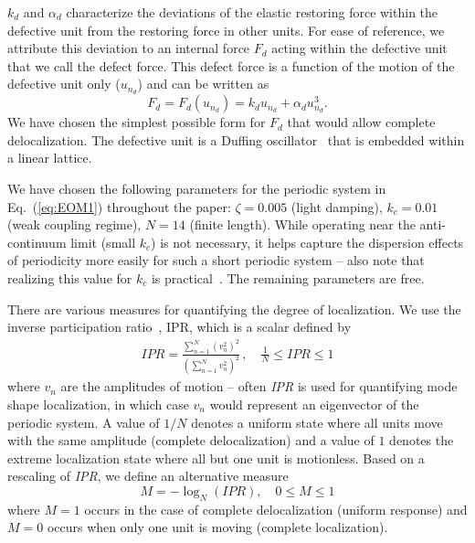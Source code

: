 \documentclass[aps,pre,twocolumn,groupedaddress]{revtex4-1}
\begin{document}
{\color{black}$k_d$ and $\alpha_d$ characterize the deviations of the elastic restoring force within the defective unit from the restoring force in other units. For ease of reference, we attribute this deviation to an internal force $F_d$ acting within the defective unit that we call the {defect force}. This defect force is a function of the motion of the defective unit only ($u_{n_d}$) and can be written as} 
\begin{equation}
	\label{eq:Fd}
	F_d=F_d(u_{n_d})=k_d u_{n_d} + \alpha_d u_{n_d}^3  .
\end{equation}
We have chosen the simplest possible form for $F_d$ that would allow complete delocalization. {\color{black}The defective unit is a Duffing oscillator~\cite{duffingBook} that is embedded within a linear lattice.}%


We have chosen the following parameters for the periodic system in Eq.~(\ref{eq:EOM1}) throughout the paper: $\zeta=0.005$ (light damping), $k_c=0.01$ (weak coupling regime), $N=14$ (finite length). While operating near the anti-continuum limit (small $k_c$) is not necessary, it helps capture the dispersion effects of periodicity more easily for such a short periodic system -- also note that realizing this value for $k_c$ is practical~\cite{DBcolloq,EnglishCuevas,JSV1}. 
The remaining parameters are free. 


There are various measures for quantifying the degree of localization. We use the inverse participation ratio~\cite{andersonRev}, IPR, which is a scalar defined by 
\begin{eqnarray*}
	\label{ipr}
	I\!P\!R = \frac{\sum^N_{n=1} (v_n^2)^2}{\left(\sum^N_{n=1} v_n^2\right)^2} \, , \quad \frac{1}{N} \le I\!P\!R \le 1
\end{eqnarray*}
where $v_n$ are the amplitudes of motion -- often \emph{IPR} is used for quantifying mode shape localization, in which case $v_n$ would represent an eigenvector of the periodic system. %
A value of $1/N$ denotes a uniform state where all units move with the same amplitude (complete delocalization) and a value of $1$ denotes the extreme localization state where all but one unit is motionless. 
Based on a rescaling of \emph{IPR}, we define an alternative measure
\begin{equation}
	M = -\log_N(I\!P\!R), \quad 0 \le M \le 1
\end{equation}
where $M=1$ occurs in the case of complete delocalization (uniform response) and $M=0$ occurs when only one unit is moving (complete localization). 
\end{document}
